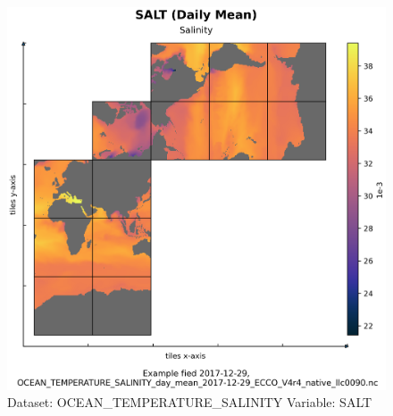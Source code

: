 \begin{figure}[H]
\centering
\includegraphics[width=\textwidth]{../images/plots/native_plots/Ocean_Temperature_and_Salinity/SALT.png}
\caption{Dataset: OCEAN\_TEMPERATURE\_SALINITY Variable: SALT}
\label{tab:table-OCEAN_TEMPERATURE_SALINITY_SALT-Plot}
\end{figure}
\pagebreak
